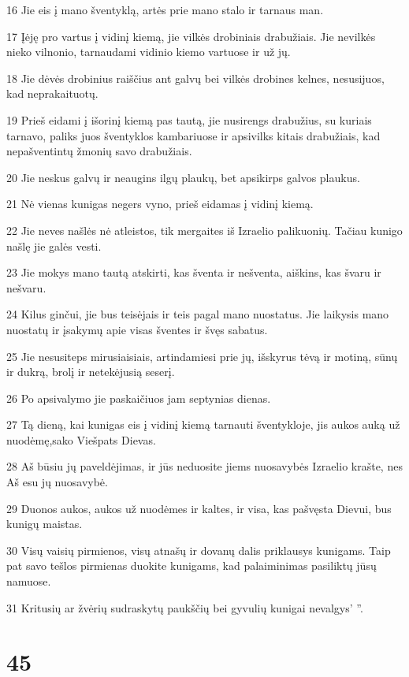 \par 16 Jie eis į mano šventyklą, artės prie mano stalo ir tarnaus man. 
\par 17 Įėję pro vartus į vidinį kiemą, jie vilkės drobiniais drabužiais. Jie nevilkės nieko vilnonio, tarnaudami vidinio kiemo vartuose ir už jų. 
\par 18 Jie dėvės drobinius raiščius ant galvų bei vilkės drobines kelnes, nesusijuos, kad neprakaituotų. 
\par 19 Prieš eidami į išorinį kiemą pas tautą, jie nusirengs drabužius, su kuriais tarnavo, paliks juos šventyklos kambariuose ir apsivilks kitais drabužiais, kad nepašventintų žmonių savo drabužiais. 
\par 20 Jie neskus galvų ir neaugins ilgų plaukų, bet apsikirps galvos plaukus. 
\par 21 Nė vienas kunigas negers vyno, prieš eidamas į vidinį kiemą. 
\par 22 Jie neves našlės nė atleistos, tik mergaites iš Izraelio palikuonių. Tačiau kunigo našlę jie galės vesti. 
\par 23 Jie mokys mano tautą atskirti, kas šventa ir nešventa, aiškins, kas švaru ir nešvaru. 
\par 24 Kilus ginčui, jie bus teisėjais ir teis pagal mano nuostatus. Jie laikysis mano nuostatų ir įsakymų apie visas šventes ir švęs sabatus. 
\par 25 Jie nesusiteps mirusiaisiais, artindamiesi prie jų, išskyrus tėvą ir motiną, sūnų ir dukrą, brolį ir netekėjusią seserį. 
\par 26 Po apsivalymo jie paskaičiuos jam septynias dienas. 
\par 27 Tą dieną, kai kunigas eis į vidinį kiemą tarnauti šventykloje, jis aukos auką už nuodėmę,­sako Viešpats Dievas.­ 
\par 28 Aš būsiu jų paveldėjimas, ir jūs neduosite jiems nuosavybės Izraelio krašte, nes Aš esu jų nuosavybė. 
\par 29 Duonos aukos, aukos už nuodėmes ir kaltes, ir visa, kas pašvęsta Dievui, bus kunigų maistas. 
\par 30 Visų vaisių pirmienos, visų atnašų ir dovanų dalis priklausys kunigams. Taip pat savo tešlos pirmienas duokite kunigams, kad palaiminimas pasiliktų jūsų namuose. 
\par 31 Kritusių ar žvėrių sudraskytų paukščių bei gyvulių kunigai nevalgys’ ”.



\chapter{45}


